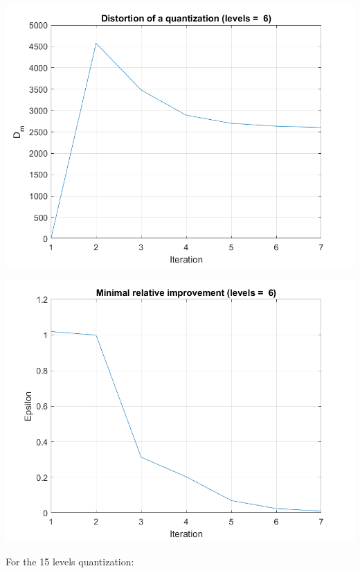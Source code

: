\documentclass[a4paper]{iacas}
\begin{document}
\vskip 0.1in
\begin{minipage}{1\textwidth}
\centering
	\includegraphics[scale=0.9]{../imgs/imgs_q4/q4_distortion_levels_6_init_1.png}
\end{minipage}
\vskip 0.1in

\vskip 0.1in
\begin{minipage}{1\textwidth}
\centering
	\includegraphics[scale=0.9]{../imgs/imgs_q4/q4_epsilon_levels_6_init_1.png}
\end{minipage}
\vskip 0.1in


For the 15 levels quantization:
\end{document}
